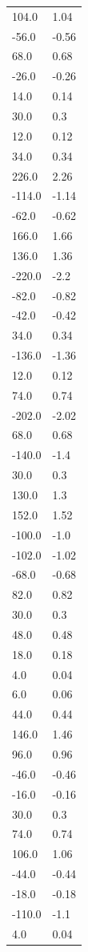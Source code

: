 \begin{longtable}{ll}
104.0 & 1.04 \\
-56.0 & -0.56 \\
68.0 & 0.68 \\
-26.0 & -0.26 \\
14.0 & 0.14 \\
30.0 & 0.3 \\
12.0 & 0.12 \\
34.0 & 0.34 \\
226.0 & 2.26 \\
-114.0 & -1.14 \\
-62.0 & -0.62 \\
166.0 & 1.66 \\
136.0 & 1.36 \\
-220.0 & -2.2 \\
-82.0 & -0.82 \\
-42.0 & -0.42 \\
34.0 & 0.34 \\
-136.0 & -1.36 \\
12.0 & 0.12 \\
74.0 & 0.74 \\
-202.0 & -2.02 \\
68.0 & 0.68 \\
-140.0 & -1.4 \\
30.0 & 0.3 \\
130.0 & 1.3 \\
152.0 & 1.52 \\
-100.0 & -1.0 \\
-102.0 & -1.02 \\
-68.0 & -0.68 \\
82.0 & 0.82 \\
30.0 & 0.3 \\
48.0 & 0.48 \\
18.0 & 0.18 \\
4.0 & 0.04 \\
6.0 & 0.06 \\
44.0 & 0.44 \\
146.0 & 1.46 \\
96.0 & 0.96 \\
-46.0 & -0.46 \\
-16.0 & -0.16 \\
30.0 & 0.3 \\
74.0 & 0.74 \\
106.0 & 1.06 \\
-44.0 & -0.44 \\
-18.0 & -0.18 \\
-110.0 & -1.1 \\
4.0 & 0.04 \\

\end{longtable}
